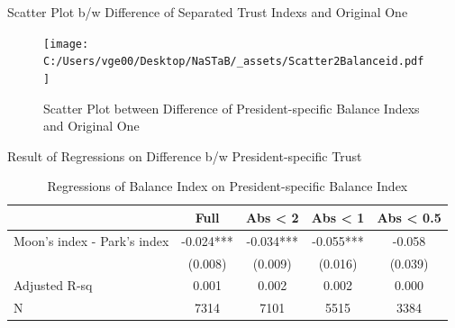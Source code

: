 \documentclass[
  ignorenonframetext,
]{beamer}
\begin{document}
\begin{frame}{Scatter Plot b/w Difference of Separated Trust Indexs and
Original One}
\protect\hypertarget{scatter-plot-bw-difference-of-separated-trust-indexs-and-original-one-1}{}
\begin{figure}
\centering
\texttt{[image: C:/Users/vge00/Desktop/NaSTaB/\_assets/Scatter2Balanceid.pdf]}
\caption{Scatter Plot between Difference of President-specific Balance
Indexs and Original One}
\end{figure}
\end{frame}

\begin{frame}{Result of Regressions on Difference b/w President-specific
Trust}
\protect\hypertarget{result-of-regressions-on-difference-bw-president-specific-trust-1}{}
\begin{table}

\caption{\label{tab:kableRegTrustidOnDiff2Balanceid}Regressions of Balance Index on President-specific Balance Index}
\centering
\fontsize{9}{11}\selectfont
\begin{tabular}[t]{lcccc}
\toprule
 & Full & Abs < 2 & Abs < 1 & Abs < 0.5\\
\midrule
Moon's index - Park's index & -0.024*** & -0.034*** & -0.055*** & -0.058\\
 & (0.008) & (0.009) & (0.016) & (0.039)\\
Adjusted R-sq & 0.001 & 0.002 & 0.002 & 0.000\\
N & 7314 & 7101 & 5515 & 3384\\
\bottomrule
\end{tabular}
\end{table}
\end{frame}
\end{document}
